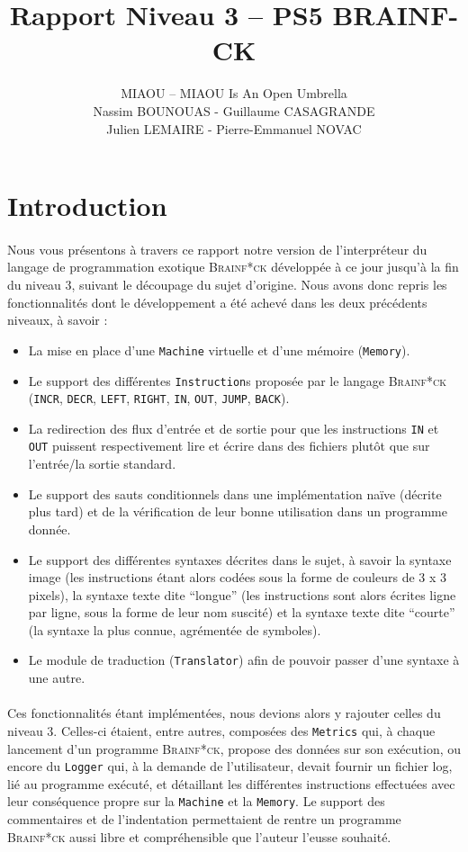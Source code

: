 \documentclass[a4paper]{article}
\title{Rapport Niveau 3 – PS5 BRAINF-CK}
\author{MIAOU – MIAOU Is An Open Umbrella\\
Nassim BOUNOUAS - Guillaume CASAGRANDE \\ Julien LEMAIRE - Pierre-Emmanuel NOVAC}
\begin{document}
\maketitle

\section{Introduction}
\paragraph{}Nous vous présentons à travers ce rapport notre version de l'interpréteur du langage de programmation exotique \textsc{Brainf*ck} développée à ce jour jusqu'à la fin du niveau 3, suivant le découpage du sujet d'origine. Nous avons donc repris les fonctionnalités dont le développement a été achevé dans les deux précédents niveaux, à savoir :
\begin{itemize}
	\item La mise en place d'une \texttt{Machine} virtuelle et d'une mémoire (\texttt{Memory}).
	\item Le support des différentes \texttt{Instruction}s proposée par le langage \textsc{Brainf*ck} (\texttt{INCR}, \texttt{DECR}, \texttt{LEFT}, \texttt{RIGHT}, \texttt{IN}, \texttt{OUT}, \texttt{JUMP}, \texttt{BACK}).
	\item La redirection des flux d'entrée et de sortie pour que les instructions \texttt{IN} et \texttt{OUT} puissent respectivement lire et écrire dans des fichiers plutôt que sur l'entrée/la sortie standard.
	\item Le support des sauts conditionnels dans une implémentation naïve (décrite plus tard) et de la vérification de leur bonne utilisation dans un programme donnée.
	\item Le support des différentes syntaxes décrites dans le sujet, à savoir la syntaxe image (les instructions étant alors codées sous la forme de couleurs de 3 x 3 pixels), la syntaxe texte dite ``longue'' (les instructions sont alors écrites ligne par ligne, sous la forme de leur nom suscité) et la syntaxe texte dite ``courte'' (la syntaxe la plus connue, agrémentée de symboles).
	\item Le module de traduction (\texttt{Translator}) afin de pouvoir passer d'une syntaxe à une autre.
\end{itemize}
\paragraph{}Ces fonctionnalités étant implémentées, nous devions alors y rajouter celles du niveau 3. Celles-ci étaient, entre autres, composées des \texttt{Metrics} qui, à chaque lancement d'un programme \textsc{Brainf*ck}, propose des données sur son exécution, ou encore du \texttt{Logger} qui, à la demande de l'utilisateur, devait fournir un fichier log, lié au programme exécuté, et détaillant les différentes instructions effectuées avec leur conséquence propre sur la \texttt{Machine} et la \texttt{Memory}. Le support des commentaires et de l'indentation permettaient de rentre un programme \textsc{Brainf*ck} aussi libre et compréhensible que l'auteur l'eusse souhaité.
\end{document}

